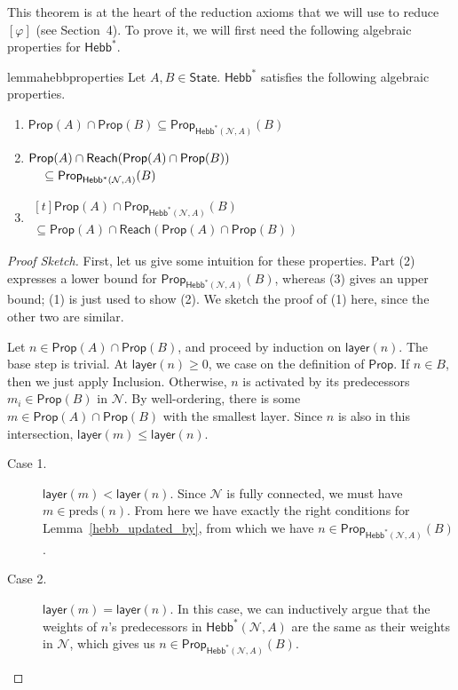\documentclass[letterpaper]{article}
\theoremstyle{definition}
\newenvironment{sketch}{\begin{proof}[Proof Sketch]}{\end{proof}}
\newcommand{\State}{\mathsf{State}}
\newcommand{\preds}[1]{\mbox{preds}(#1)}
\newcommand{\layer}[1]{\mathsf{layer}(#1)}
\newcommand{\Net}{\mathcal{N}}
\newcommand{\Prop}{\mathsf{Prop}}
\newcommand{\Reach}{\mathsf{Reach}}
\newcommand{\Hebbstar}[2]{\mathsf{Hebb}^*(#1, #2)}
\newcommand{\HebbstarNoArgs}{\mathsf{Hebb}^*}
\newcommand{\Hebbop}[1]{[#1]}
\begin{document}
This theorem is at the heart of the reduction axioms that we will use to reduce $\Hebbop{\varphi}$ (see Section~4).  To prove it, we will first need the following algebraic properties for $\HebbstarNoArgs$.
\begin{restatable}{lemma}{hebbproperties}
    \label{hebb_properties}
    Let $A, B \in \State$.  $\HebbstarNoArgs$ satisfies the following algebraic properties.
    \begin{enumerate}
        \item $\Prop(A) \cap \Prop(B) \subseteq \Prop_{\Hebbstar{\Net}{A}}(B)$
        \item $\begin{multlined}[t]
            \Prop(A) \cap \Reach(\Prop(A) \cap \Prop(B)) \\
            \subseteq \Prop_{\Hebbstar{\Net}{A}}(B) \hfill
        \end{multlined}$
        \item $\begin{multlined}[t]
            \Prop(A) \cap \Prop_{\Hebbstar{\Net}{A}}(B)\\
            \subseteq \Prop(A) \cap \Reach(\Prop(A) \cap \Prop(B))
        \end{multlined}$
    \end{enumerate}
\end{restatable}
\begin{sketch}
    First, let us give some intuition for these properties.  Part (2) expresses a lower bound for $\Prop_{\Hebbstar{\Net}{A}}(B)$, whereas (3) gives an upper bound; (1) is just used to show (2).  We sketch the proof of (1) here, since the other two are similar.

    Let $n \in \Prop(A) \cap \Prop(B)$, and proceed by induction on $\layer{n}$.  The base step is trivial.  At $\layer{n} \geq 0$, we case on the definition of $\Prop$. If $n \in B$, then we just apply Inclusion.  Otherwise, $n$ is activated by its predecessors $m_i \in \Prop(B)$ in $\Net$.  By well-ordering, there is some $m \in \Prop(A) \cap \Prop(B)$ with the smallest layer.  Since $n$ is also in this intersection, $\layer{m} \leq \layer{n}$.
        \begin{description}
            \item[Case 1.] $\layer{m} < \layer{n}$.  Since $\Net$ is fully connected, we must have $m \in \preds{n}$.  From here we have exactly the right conditions for Lemma~\ref{hebb_updated_by}, from which we have $n \in \Prop_{\Hebbstar{\Net}{A}}(B)$.
            \item[Case 2.] $\layer{m} = \layer{n}$. In this case, we can inductively argue that the weights of $n$'s predecessors in $\Hebbstar{\Net}{A}$ are the same as their weights in $\Net$, which gives us $n \in \Prop_{\Hebbstar{\Net}{A}}(B)$.\qedhere
        \end{description}
\end{sketch}
\end{document}
